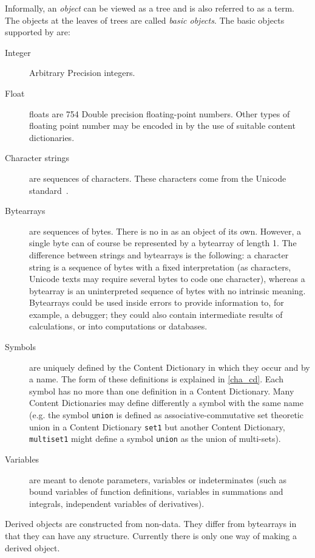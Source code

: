 Informally, an \OM \emph{object} can be
viewed as a tree and is also referred to as a term.  The objects at
the leaves of \OM trees are called \emph{basic
objects}.  The basic objects supported by \OM are:
\begin{description}
\item[Integer]  Arbitrary Precision
integers.
\item[Float] \OM floats are  754 Double precision floating-point
  numbers. Other types of floating point number may be encoded in \OM by the use of
  suitable content dictionaries.
\item[Character strings]are sequences of characters. These characters come from the
  Unicode standard~\cite{UNICODE}.
\item[Bytearrays] are sequences of bytes. There is no  in \OM as an object
  of its own. However, a single byte can of course be represented by a bytearray of length
  1.  The difference between strings and bytearrays is the following: a character string
  is a sequence of bytes with a fixed interpretation (as characters, Unicode texts may
  require several bytes to code one character), whereas a bytearray is an uninterpreted
  sequence of bytes with no intrinsic meaning.  Bytearrays could be used inside \OM errors
  to provide information to, for example, a debugger; they could also contain intermediate
  results of calculations, or  into computations or databases.
\item[Symbols] are uniquely defined by the Content Dictionary in which they occur and by a
  name.  The form of these definitions is explained in \ref{cha_cd}.  Each symbol has no
  more than one definition in a Content Dictionary. Many Content Dictionaries may define
  differently a symbol with the same name (e.g. the symbol \lstinline|union| is defined
  as associative-commutative set theoretic union in a Content Dictionary \lstinline|set1|
  but another Content Dictionary, \lstinline|multiset1| might define a symbol
  \lstinline|union| as the union of multi-sets).
\item[Variables] are meant to denote parameters, variables or indeterminates (such as
  bound variables of function definitions, variables in summations and integrals,
  independent variables of derivatives).
\end{description} 
Derived \OM objects are constructed from non-\OM data.  They differ from bytearrays in
that they can have any structure.  Currently there is only one way of making a derived \OM
object.

